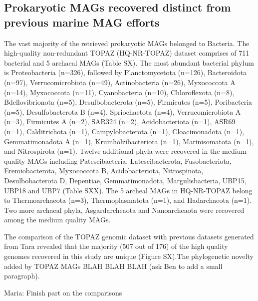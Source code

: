 \documentclass[12pt]{article}
\numberwithin{equation}{section}
\begin{document}
\subsection*{Prokaryotic MAGs recovered distinct from previous marine MAG efforts}
The vast majority of the retrieved prokaryotic MAGs belonged to Bacteria. The high-quality non-redundant TOPAZ (HQ-NR-TOPAZ) dataset comprises of 711 bacterial and 5 archaeal MAGs (Table SX). The most abundant bacterial phylum is Proteobacteria (n=326), followed by Planctomycetota (n=126), Bacteroidota (n=97), Verrucomicrobiota (n=49), Actinobacteria (n=26), Myxococcota A (n=14), Myxococcota (n=11), Cyanobacteria (n=10), Chloroflexota (n=8), Bdellovibrionota (n=5), Desulbobacterota (n=5), Firmicutes (n=5), Poribacteria (n=5), Desulfobacterota B (n=4), Spriochaetota (n=4), Verrucomicrobiota A (n=3), Firmicutes A (n=2), SAR324 (n=2), Acidobacteriota (n=1), ASR69 (n=1), Calditrichota (n=1), Campylobacterota (n=1), Cloacimonadota (n=1), Gemmatimonadota A (n=1), Krumholzibacteriota (n=1), Marinisomatota (n=1), and Nitrospirota (n=1). Twelve additional phyla were recovered in the medium quality MAGs including Patescibacteria, Latescibacterota, Fusobacteriota, Eremiobacterota, Myxococcota B, Acidobacteriota, Nitrospinota, Desulbobacterota D, Depentiae, Gemmatimonadota, Margulisbacteria, UBP15, UBP18 and UBP7 (Table SXX). The 5 archeal MAGs in HQ-NR-TOPAZ belong to Thermoarchaeota (n=3), Thermoplasmatota (n=1), and Hadarchaeota (n=1). Two more archaeal phyla, Asgardarcheaota and Nanoarcheaota were recovered among the medium quality MAGs.

The comparison of the TOPAZ genomic dataset with previous datasets generated from Tara \citep{Tully2018reconstruction, Parks2017Recovery, Delmont2018Nitrogen-fixing} revealed that the majority (507 out of 176) of the high quality genomes recovered in this study are unique (Figure SX).The phylogenetic novelty added by TOPAZ MAGs BLAH BLAH BLAH (ask Ben to add a small paragraph).

Maria: Finish part on the comparisons


\end{document}
